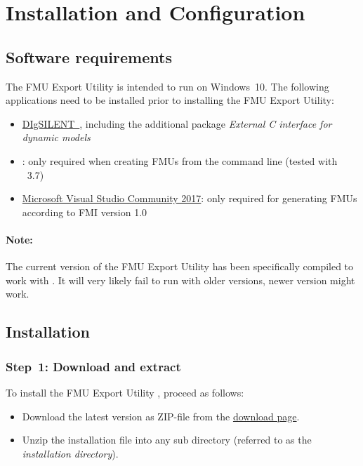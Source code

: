 
\chapter{Installation and Configuration}

\section{Software requirements}

The \fmipp \pf FMU Export Utility is intended to run on Windows~10. The following applications need to be installed prior to installing the \fmipp \pf FMU Export Utility:
\begin{itemize}
  \item \href{http://www.digsilent.com/}{DIgSILENT~\pfversion}, including the additional package \emph{External C interface for dynamic models}
  \item \href{https://www.python.org/}{\python}: only required when creating FMUs from the command line (tested with \python~3.7)
  \item \href{https://www.visualstudio.com/vs/older-downloads/}{Microsoft Visual Studio Community 2017}: only required for generating FMUs according to FMI version 1.0
\end{itemize}

\subsubsection*{Note:}
The current version of the \fmipp \pf FMU Export Utility has been specifically compiled to work with \pfversion.
It will very likely fail to run with older versions, newer version might work.


\section{Installation}
\label{sec:install}

\subsection*{Step~1: Download and extract}

To install the \fmipp \pf FMU Export Utility , proceed as follows:
\begin{itemize}
  \item Download the latest version as ZIP-file from the \href{http://sourceforge.net/projects/powerfactory-fmu/files/latest/download}{download page}.
  \item Unzip the installation file into any sub directory (referred to as the \emph{installation directory}).
\end{itemize}

